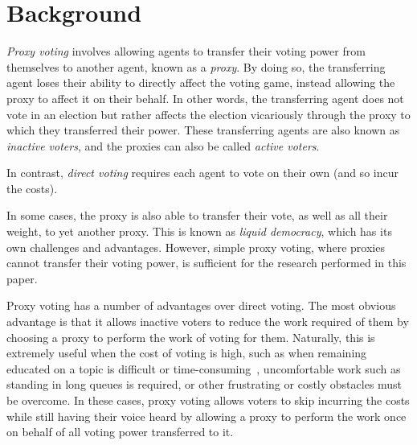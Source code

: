 

\section{Background}\label{sec:background}
\textit{Proxy voting} involves allowing agents to transfer their voting power
from themselves to another agent, known as a \textit{proxy}\cite[para.~1.4]
{Cohensius2017}.
By doing so, the transferring agent loses their ability to directly affect the
voting game, instead allowing the proxy to affect it on their behalf.
In other words, the transferring agent does not vote in an election but rather
affects the election vicariously through the proxy to which they transferred
their power.
These transferring agents are also known as \textit{inactive voters}, and the
proxies can also be called \textit{active voters}.

In contrast, \textit{direct voting} requires each agent to vote on their own
(and so incur the costs).

In some cases, the proxy is also able to transfer their vote, as well as all
their weight, to yet another proxy.
This is known as \textit{liquid democracy}, which has its own challenges and
advantages.
However, simple proxy voting, where proxies cannot transfer their voting power,
is sufficient for the research performed in this paper.

Proxy voting has a number of advantages over direct voting.
The most obvious advantage is that it allows inactive voters to reduce the work
required of them by choosing a proxy to perform the work of voting for them.
Naturally, this is extremely useful when the cost of voting is high, such as
when remaining educated on a topic is difficult or
time-consuming~\cite[para.~1.1]{Mueller1972}, uncomfortable work such as
standing in long queues is required, or other frustrating or costly obstacles
must be overcome.
In these cases, proxy voting allows voters to skip incurring the costs while
still having their voice heard by allowing a proxy to perform the work once on
behalf of all voting power transferred to it.

